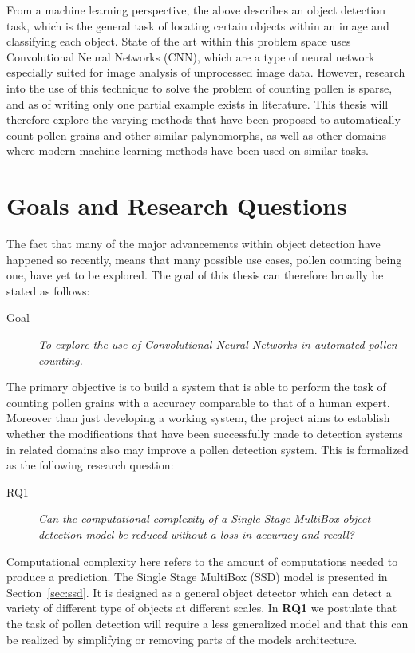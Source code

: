 From a machine learning perspective, the above describes an object detection task, which is the general task of locating certain objects within an image and classifying each object.
State of the art within this problem space uses Convolutional Neural Networks (CNN), which are a type of neural network especially suited for image analysis of unprocessed image data.
However, research into the use of this technique to solve the problem of counting pollen is sparse, and as of writing only one partial example exists in literature.
This thesis will therefore explore the varying methods that have been proposed to automatically count pollen grains and other similar palynomorphs, as well as other domains where modern machine learning methods have been used on similar tasks.

\section{Goals and Research Questions}\label{sec:Goals and Research Questions}
The fact that many of the major advancements within object detection have happened so recently, means that many possible use cases, pollen counting being one, have yet to be explored.
The goal of this thesis can therefore broadly be stated as follows:

\begin{description}
\item[Goal] \textit{To explore the use of Convolutional Neural Networks in automated pollen counting.}
\end{description}

The primary objective is to build a system that is able to perform the task of counting pollen grains with a accuracy comparable to that of a human expert.
Moreover than just developing a working system, the project aims to establish whether the modifications that have been successfully made to detection systems in related domains also may improve a pollen detection system.
This is formalized as the following research question: 

\begin{description}
\item[RQ1] \textit{Can the computational complexity of a Single Stage MultiBox object detection model be reduced without a loss in accuracy and recall?}
\end{description}

Computational complexity here refers to the amount of computations needed to produce a prediction.
The Single Stage MultiBox (SSD) model is presented in Section~\ref{sec:ssd}.
It is designed as a general object detector which can detect a variety of different type of objects at different scales.
In \textbf{RQ1} we postulate that the task of pollen detection will require a less generalized model and that this can be realized by simplifying or removing parts of the models architecture.
 
